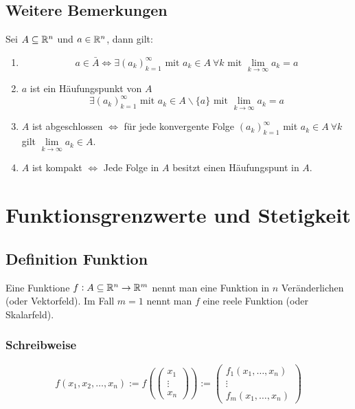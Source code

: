 \subsection{Weitere Bemerkungen}
Sei $A \subseteq  \mathbb{R}^n$ und $a \in \mathbb{R}^n$, dann gilt:
\begin{enumerate}[label= (\alph*)]
    \item
        \begin{equation*}
            a \in \bar{A} \Leftrightarrow \exists {(a_k)}_{k=1}^\infty
            \text{ mit } a_k \in A\ \forall k \text{ mit } \lim_{k \rightarrow \infty}
            a_k = a
        \end{equation*}
    \item $a$ ist ein Häufungspunkt von $A$
        \begin{equation*}
            \exists {(a_k)}_{k=1}^\infty \text{ mit } a_k \in A \backslash \{a\}
            \text{ mit } \lim_{k \rightarrow \infty} a_k = a
        \end{equation*}
    \item $A$ ist abgeschlossen $\Leftrightarrow$ für jede konvergente Folge
        ${(a_k)}_{k=1}^\infty$ mit $a_k \in A\ \forall k$ gilt
        $\lim\limits_{k \rightarrow \infty} a_k \in A$.
    \item $A$ ist kompakt $\Leftrightarrow$ Jede Folge in $A$ besitzt einen
        Häufungspunt in $A$.
\end{enumerate}

\section{Funktionsgrenzwerte und Stetigkeit}

\subsection{Definition Funktion}
Eine Funktione $f: A \subseteq \mathbb{R}^n \rightarrow \mathbb{R}^m$ nennt man eine Funktion in
$n$ Veränderlichen (oder Vektorfeld).
Im Fall $m=1$ nennt man $f$ eine reele Funktion (oder Skalarfeld).

\subsubsection{Schreibweise}
\begin{equation*}
    f(x_1, x_2, \ldots, x_n) :=
    f\left(\begin{pmatrix}
        x_1\\
        \vdots \\
        x_n
    \end{pmatrix} \right) :=
    \begin{pmatrix}
        f_1(x_1, \ldots, x_n)\\
        \vdots \\
        f_m(x_1, \ldots, x_n)
    \end{pmatrix}
\end{equation*}

